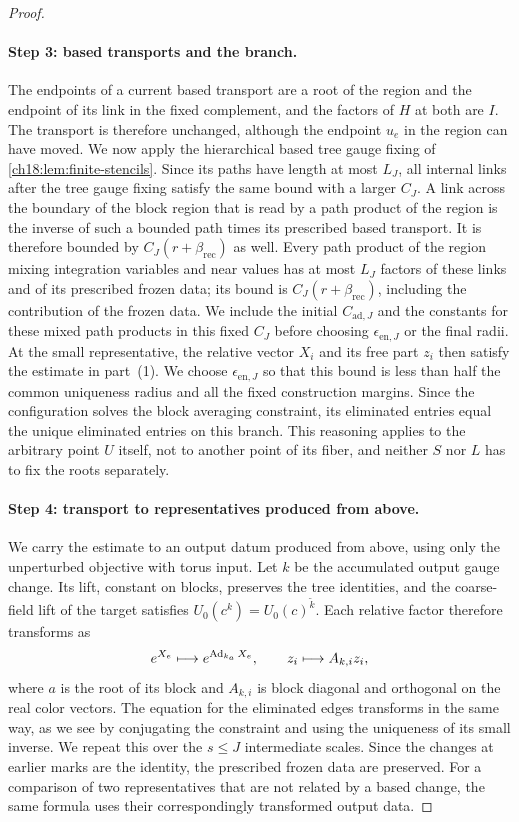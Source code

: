 \begin{proof}
\paragraph{Step 3: based transports and the branch.}
The endpoints of a current based transport are a root of the region and the endpoint of its link in the fixed complement, and the factors of $H$ at both are $I$. The transport is therefore unchanged, although the endpoint $u_e$ in the region can have moved. We now apply the hierarchical based tree gauge fixing of \cref{ch18:lem:finite-stencils}. Since its paths have length at most $L_J$, all internal links after the tree gauge fixing satisfy the same bound with a larger $C_J$. A link across the boundary of the block region that is read by a path product of the region is the inverse of such a bounded path times its prescribed based transport. It is therefore bounded by $C_J(r+\beta_{\mathrm{rec}})$ as well. Every path product of the region mixing integration variables and near values has at most $L_J$ factors of these links and of its prescribed frozen data; its bound is $C_J(r+\beta_{\mathrm{rec}})$, including the contribution of the frozen data. We include the initial $C_{\mathrm{ad},J}$ and the constants for these mixed path products in this fixed $C_J$ before choosing $\epsilon_{\mathrm{en},J}$ or the final radii. At the small representative, the relative vector $X_i$ and its free part $z_i$ then satisfy the estimate in part~(1). We choose $\epsilon_{\mathrm{en},J}$ so that this bound is less than half the common uniqueness radius and all the fixed construction margins. Since the configuration solves the block averaging constraint, its eliminated entries equal the unique eliminated entries on this branch. This reasoning applies to the arbitrary point $U$ itself, not to another point of its fiber, and neither $S$ nor $L$ has to fix the roots separately.

\paragraph{Step 4: transport to representatives produced from above.}
We carry the estimate to an output datum produced from above, using only the unperturbed objective with torus input. Let $k$ be the accumulated output gauge change. Its lift, constant on blocks, preserves the tree identities, and the coarse-field lift of the target satisfies $U_0(c^k)=U_0(c)^{\widetilde k}$. Each relative factor therefore transforms as
\begin{equation}\label{ch18:eq:relative-color}
 e^{X_e}\longmapsto e^{\operatorname{Ad}_{k_a}X_e},\qquad
 z_i\longmapsto A_{k,i}z_i,
\end{equation}
where $a$ is the root of its block and $A_{k,i}$ is block diagonal and orthogonal on the real color vectors. The equation for the eliminated edges transforms in the same way, as we see by conjugating the constraint and using the uniqueness of its small inverse. We repeat this over the $s\le J$ intermediate scales. Since the changes at earlier marks are the identity, the prescribed frozen data are preserved. For a comparison of two representatives that are not related by a based change, the same formula uses their correspondingly transformed output data.


\end{proof}
